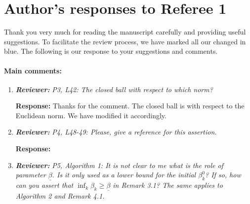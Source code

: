 \documentclass{article}
\begin{document}
\section*{Author's responses to Referee 1}
Thank you very much for reading the manuscript carefully and providing useful suggestions. To facilitate the review process, we have marked all our changed in blue.  The following is our response to your suggestions and comments.

\paragraph{Main comments:}
\begin{enumerate}
	\item  \textit{\textbf{Reviewer:}} \textit{P3, L42: The closed ball with respect to which norm?}
	
	\textbf{Response:} Thanks for the comment. The closed ball is with respect to the Euclidean norm. We have modified it accordingly.

	\item  \textit{\textbf{Reviewer:}} \textit{P4, L48-49: Please, give a reference for this assertion.}
	
	\textbf{Response:} {\color{red}{Unanswered.}}

	\item  \textit{\textbf{Reviewer:}} \textit{P5, Algorithm 1: It is not clear to me what is the role of parameter $\underline{\beta}$. Is it only used as a lower bound for the initial $\beta_k^0$? If so, how can you assert that $\inf_k \beta_k \ge \underline{\beta}$ in Remark 3.1? The same applies to Algorithm 2 and Remark 4.1.}
	

\end{enumerate}
\end{document}
